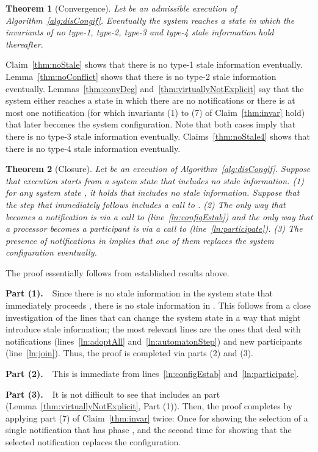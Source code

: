 \documentclass[11pt]{article}
\newtheorem{theorem}{Theorem}[section]
\newenvironment{proof}{\noindent{\bf Proof.}}{\hfill}
\begin{document}
\begin{theorem}[Convergence] 
\label{thm:staleFreeExecution}
Let  be an admissible execution of Algorithm~\ref{alg:disCongif}.
Eventually the system reaches a state  in which the invariants of no type-1, type-2, type-3 and type-4 stale information hold thereafter.  
\end{theorem}
\begin{proof}
Claim~\ref{thm:noStale} shows that there is no type-1 stale information  eventually. 
Lemma~\ref{thm:noConflict} shows that there is no type-2 stale information  eventually. 
Lemmas~\ref{thm:convDeg} and~\ref{thm:virtuallyNotExplicit} say that the system either reaches a state in which there are no notifications or there is at most one notification (for which invariants (1) to (7) of Claim~\ref{thm:invar} hold) that later  becomes the system configuration. Note that both cases imply that there is no type-3 stale information  eventually. 
Claims~\ref{thm:noStale4} shows that there is no type-4 stale information  eventually. 
\end{proof} 
 


\begin{theorem}[Closure]
\label{thm:closureThm}
Let  be an execution of Algorithm~\ref{alg:disCongif}.
Suppose that execution  starts from a system state that includes no stale information. (1) for any system state , it holds that 
 includes no stale information. Suppose that the step that immediately follows  includes a call to . (2) The only way that  becomes a notification is via a call to  (line~\ref{ln:configEstab}) and the only way that a processor becomes a participant is via a call to  (line~\ref{ln:participate}). (3) The presence of notifications in  implies that one of them replaces the system configuration eventually. 
\end{theorem}

\begin{proof} The proof essentially follows from established results above.
	
\noindent \textbf{Part (1).~}~Since there is no stale information in the system state that immediately proceeds , there is no stale information in . 
This follows from a close investigation of the 
lines that can change the system state in a way that might introduce stale information; the most  
relevant lines are the ones that deal with notifications (lines~\ref{ln:adoptAll} and~\ref{ln:automatonStep}) and new participants (line~\ref{ln:join}). 
Thus, the proof is completed via parts (2) and (3). 

\noindent \textbf{Part (2).~}~This is immediate from lines~\ref{ln:configEstab} and~\ref{ln:participate}.

\noindent \textbf{Part (3).~}~It is not difficult to see that  includes an  part (Lemma~\ref{thm:virtuallyNotExplicit}, Part (1)). 
Then, the proof completes by applying part (7) of Claim~\ref{thm:invar} twice: Once for showing the selection of a single notification that has phase , 
and the second time for showing that the selected notification replaces the configuration.~\end{proof}
\end{document}
